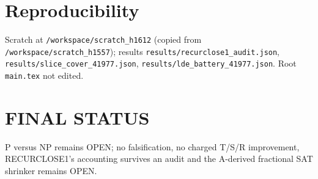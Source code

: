 \documentclass[11pt]{article}
\begin{document}
\section*{Reproducibility}
Scratch at \texttt{/workspace/scratch\_h1612} (copied from \texttt{/workspace/scratch\_h1557});
results \texttt{results/recurclose1\_audit.json}, \texttt{results/slice\_cover\_41977.json},
\texttt{results/lde\_battery\_41977.json}. Root \texttt{main.tex} not edited.

\section*{FINAL STATUS}
P versus NP remains OPEN; no falsification, no charged T/S/R improvement, RECURCLOSE1's accounting survives an audit
and the A-derived fractional SAT shrinker remains OPEN.
\end{document}
